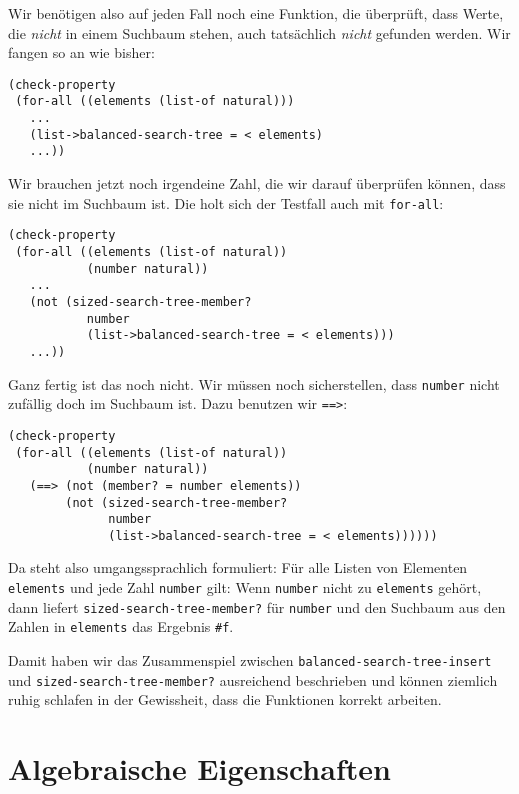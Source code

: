 %
Wir benötigen also auf jeden Fall noch eine Funktion, die überprüft,
dass Werte, die \emph{nicht} in einem Suchbaum stehen, auch
tatsächlich \emph{nicht} gefunden werden.  Wir fangen so an wie bisher:
%
\begin{lstlisting}
(check-property
 (for-all ((elements (list-of natural)))
   ...
   (list->balanced-search-tree = < elements)
   ...))
\end{lstlisting}
%
Wir brauchen jetzt noch irgendeine Zahl, die wir darauf überprüfen
können, dass sie nicht im Suchbaum ist.  Die holt sich der Testfall
auch mit \lstinline{for-all}:
%
\begin{lstlisting}
(check-property
 (for-all ((elements (list-of natural))
           (number natural))
   ...
   (not (sized-search-tree-member?
           number
           (list->balanced-search-tree = < elements)))
   ...))
\end{lstlisting}
%
Ganz fertig ist das noch nicht.  Wir müssen noch sicherstellen, dass
\lstinline{number} nicht zufällig doch im Suchbaum ist.  Dazu benutzen
wir \lstinline{==>}:
%
\begin{lstlisting}
(check-property
 (for-all ((elements (list-of natural))
           (number natural))
   (==> (not (member? = number elements))
        (not (sized-search-tree-member?
              number
              (list->balanced-search-tree = < elements))))))
\end{lstlisting}
%
Da steht also umgangssprachlich formuliert: Für alle Listen von
Elementen \lstinline{elements} und jede Zahl \lstinline{number} gilt:
Wenn \lstinline{number} nicht zu \lstinline{elements} gehört, dann
liefert \lstinline{sized-search-tree-member?} für \lstinline{number}
und den Suchbaum aus den Zahlen in \lstinline{elements} das Ergebnis
\lstinline{#f}.

Damit haben wir das Zusammenspiel zwischen
\lstinline{balanced-search-tree-insert} und
\lstinline{sized-search-tree-member?} ausreichend beschrieben und
können ziemlich ruhig schlafen in der Gewissheit, dass die Funktionen
korrekt arbeiten.

\section{Algebraische Eigenschaften}
\label{sec:algebraische-eigenschaften}

